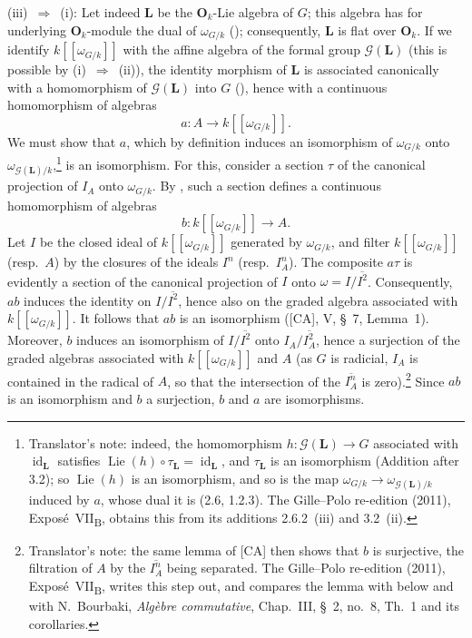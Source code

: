 \medskip
\noindent\textup{(iii)}~\(\Rightarrow\)~\textup{(i)}: Let indeed \(\mathbf L\) be the
\(\mathbf O_k\)-Lie algebra of \(G\); this algebra has for underlying
\(\mathbf O_k\)-module the dual of \(\omega_{G/k}\) \textup{()}; consequently,
\(\mathbf L\) is flat over \(\mathbf O_k\). If we identify
\(k[[\omega_{G/k}]]\) with the affine algebra of the formal group
\(\mathscr G(\mathbf L)\) \textup{(}this is possible by
\textup{(i)}~\(\Rightarrow\)~\textup{(ii)}\textup{)}, the identity morphism of
\(\mathbf L\) is associated canonically with a homomorphism of
\(\mathscr G(\mathbf L)\) into \(G\) \textup{()}, hence with a
continuous homomorphism of algebras
\[
  a:A\longrightarrow k[[\omega_{G/k}]].
\]
We must show that \(a\), which by definition induces an isomorphism of
\(\omega_{G/k}\) onto \(\omega_{\mathscr G(\mathbf L)/k}\),\footnote{Translator's note: indeed, the
homomorphism \(h\colon\mathscr G(\mathbf L)\to G\) associated with \(\operatorname{id}_{\mathbf L}\) satisfies
\(\operatorname{Lie}(h)\circ\tau_{\mathbf L}=\operatorname{id}_{\mathbf L}\), and \(\tau_{\mathbf L}\) is an
isomorphism (Addition after 3.2); so \(\operatorname{Lie}(h)\) is an isomorphism, and so is the map
\(\omega_{G/k}\to\omega_{\mathscr G(\mathbf L)/k}\) induced by \(a\), whose dual it is (2.6, 1.2.3). The
Gille--Polo re-edition (2011), Expos\'e~VII\textsubscript{B}, obtains this from its additions 2.6.2~(iii) and
3.2~(ii).} is an isomorphism.
For this, consider a section \(\tau\) of the canonical projection of
\(I_A\) onto \(\omega_{G/k}\). By , such a section defines a
continuous homomorphism of algebras
\[
  b:k[[\omega_{G/k}]]\longrightarrow A.
\]
Let \(I\) be the closed ideal of \(k[[\omega_{G/k}]]\) generated by
\(\omega_{G/k}\), and filter \(k[[\omega_{G/k}]]\) \textup{(}resp.\ \(A\)\textup{)}
by the closures of the ideals \(I^n\) \textup{(}resp.\ \(I_A^n\)\textup{)}. The
composite \(a\tau\) is evidently a section of the canonical projection of
\(I\) onto \(\omega=I/\overline{I^2}\). Consequently, \(ab\) induces the
identity on \(I/\overline{I^2}\), hence also on the graded algebra associated
with \(k[[\omega_{G/k}]]\). It follows that \(ab\) is an isomorphism
\textup{([CA], V, \S~7, Lemma~1)}. Moreover, \(b\) induces an isomorphism of
\(I/\overline{I^2}\) onto \(I_A/\overline{I_A^2}\), hence a surjection of the
graded algebras associated with \(k[[\omega_{G/k}]]\) and \(A\)
\textup{(}as \(G\) is radicial, \(I_A\) is contained in the radical of \(A\), so
that the intersection of the \(\overline{I_A^n}\) is zero\textup{)}.\footnote{Translator's note: the
same lemma of [CA] then shows that \(b\) is surjective, the filtration of \(A\) by the \(\overline{I_A^n}\) being
separated. The Gille--Polo re-edition (2011), Expos\'e~VII\textsubscript{B}, writes this step out, and compares
the lemma with  below and with N.~Bourbaki, \emph{Alg\`ebre commutative},
Chap.~III, \S~2, no.~8, Th.~1 and its corollaries.} Since \(ab\)
is an isomorphism and \(b\) a surjection, \(b\) and \(a\) are
isomorphisms.

